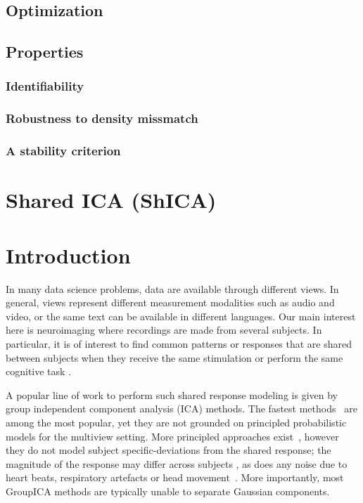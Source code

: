 \documentclass[12pt]{report}
\begin{document}
\subsection{Optimization}
\subsection{Properties}
\subsubsection{Identifiability}
\subsubsection{Robustness to density missmatch}
\subsubsection{A stability criterion}

\section{Shared ICA (ShICA)}
\section{Introduction}
In many data science problems, data are available through different views. In general, views represent different measurement modalities such as audio and video, or the same text can be available in different languages. Our main interest here is neuroimaging where recordings are made from several subjects. In particular, it is of interest to find common patterns or responses that are shared between subjects when they receive the same stimulation or perform the same cognitive task \citep{chen2015reduced,richard2020modeling}. 

A popular line of work to perform such shared response modeling is given by group independent component analysis (ICA) methods. The fastest methods~\cite{calhoun2001method, varoquaux2009canica} are among the most popular, yet they are not grounded on principled probabilistic models for the multiview setting. 
%
More principled approaches exist~\cite{richard2020modeling, guo2008unified}, however they do not model subject specific-deviations from the shared response; the magnitude of the response may differ across subjects \cite{penny2007random}, as does any noise due to heart beats, respiratory artefacts or head movement~\cite{liu2016noise}.
%
More importantly, most GroupICA methods are typically unable to separate Gaussian components.
\end{document}

